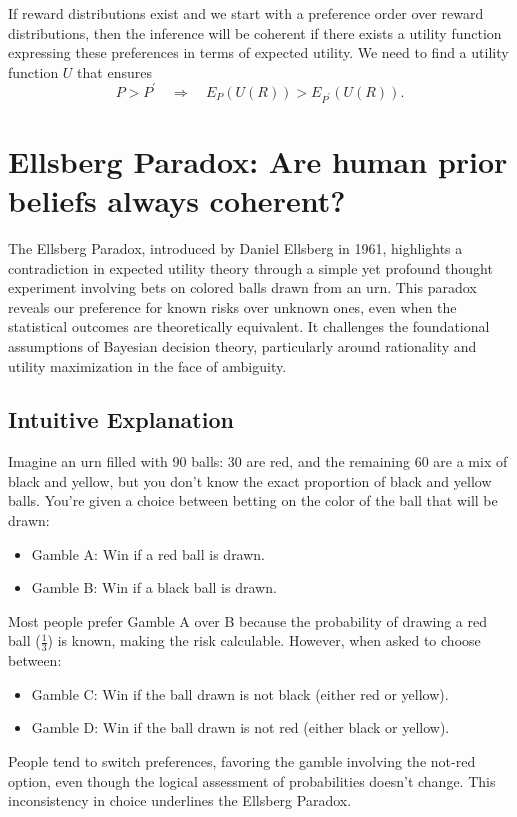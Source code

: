 \documentclass{article}
\begin{document}
If reward distributions exist and we start with a preference order over reward distributions, then the inference will be coherent if there exists a utility function expressing these preferences in terms of expected utility. We need to find a utility function $U$ that ensures
$$
P>P^{\prime} \quad \Rightarrow \quad E_P(U(R))>E_{P^{\prime}}(U(R)).
$$


\section{Ellsberg Paradox: Are human prior beliefs always coherent?}

The Ellsberg Paradox, introduced by Daniel Ellsberg in 1961, highlights a contradiction in expected utility theory through a simple yet profound thought experiment involving bets on colored balls drawn from an urn. This paradox reveals our preference for known risks over unknown ones, even when the statistical outcomes are theoretically equivalent. It challenges the foundational assumptions of Bayesian decision theory, particularly around rationality and utility maximization in the face of ambiguity.

\subsection{Intuitive Explanation}
Imagine an urn filled with 90 balls: 30 are red, and the remaining 60 are a mix of black and yellow, but you don't know the exact proportion of black and yellow balls. You're given a choice between betting on the color of the ball that will be drawn: 
\begin{itemize}
    \item Gamble A: Win if a red ball is drawn.
    \item Gamble B: Win if a black ball is drawn.
\end{itemize}
Most people prefer Gamble A over B because the probability of drawing a red ball (\(\frac{1}{3}\)) is known, making the risk calculable. However, when asked to choose between:
\begin{itemize}
    \item Gamble C: Win if the ball drawn is not black (either red or yellow).
    \item Gamble D: Win if the ball drawn is not red (either black or yellow).
\end{itemize}
People tend to switch preferences, favoring the gamble involving the not-red option, even though the logical assessment of probabilities doesn't change. This inconsistency in choice underlines the Ellsberg Paradox.
\end{document}
